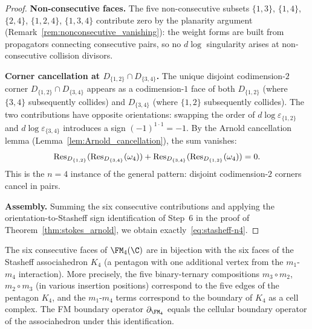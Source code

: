 \begin{proof}
\medskip\noindent
\textbf{Non-consecutive faces.}
The five non-consecutive subsets $\{1,3\}$, $\{1,4\}$,
$\{2,4\}$, $\{1,2,4\}$, $\{1,3,4\}$ contribute zero by
the planarity argument
(Remark~\ref{rem:nonconsecutive_vanishing}): the weight
forms are built from propagators connecting consecutive
pairs, so no $d\log$ singularity arises at non-consecutive
collision divisors.

\medskip\noindent
\textbf{Corner cancellation at $D_{\{1,2\}} \cap D_{\{3,4\}}$.}
The unique disjoint codimension-$2$ corner
$D_{\{1,2\}} \cap D_{\{3,4\}}$ appears as a codimension-$1$
face of both $D_{\{1,2\}}$ (where $\{3,4\}$ subsequently
collides) and $D_{\{3,4\}}$ (where $\{1,2\}$ subsequently
collides). The two contributions have opposite orientations:
swapping the order of $d\log\varepsilon_{\{1,2\}}$ and
$d\log\varepsilon_{\{3,4\}}$ introduces a sign $(-1)^{1 \cdot 1} = -1$.
By the Arnold cancellation lemma
(Lemma~\ref{lem:Arnold_cancellation}), the sum vanishes:
\[
\operatorname{Res}_{D_{\{1,2\}}}(\operatorname{Res}_{D_{\{3,4\}}}(\omega_4))
+ \operatorname{Res}_{D_{\{3,4\}}}(\operatorname{Res}_{D_{\{1,2\}}}(\omega_4))
= 0.
\]
This is the $n = 4$ instance of the general pattern: disjoint
codimension-$2$ corners cancel in pairs.

\medskip\noindent
\textbf{Assembly.}
Summing the six consecutive contributions and applying the
orientation-to-Stasheff sign identification of Step~6 in the
proof of Theorem~\ref{thm:stokes_arnold}, we obtain
exactly~\eqref{eq:stasheff-n4}.
\end{proof}

\begin{remark}
The six consecutive faces of $\FM_4(\C)$ are in bijection
with the six faces of the Stasheff associahedron $K_4$
(a pentagon with one additional vertex from the
$m_1$-$m_4$ interaction). More precisely, the five
binary-ternary compositions
$m_3 \circ m_2$, $m_2 \circ m_3$ (in various insertion
positions) correspond to the five edges of the pentagon
$K_4$, and the $m_1$-$m_4$ terms correspond to the
boundary of $K_4$ as a cell complex. The FM boundary
operator $\partial_{\FM_4}$ equals the cellular boundary
operator of the associahedron under this identification.
\end{remark}

